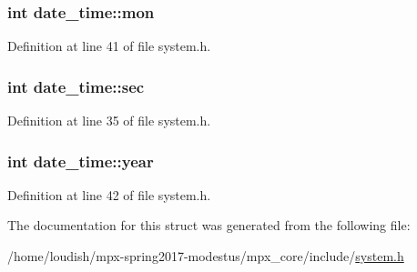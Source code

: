 \subsubsection[{\texorpdfstring{mon}{mon}}]{\setlength{\rightskip}{0pt plus 5cm}int date\+\_\+time\+::mon}\hypertarget{structdate__time_a6e8a5baa74a619330ba9925cf0baf250}{}\label{structdate__time_a6e8a5baa74a619330ba9925cf0baf250}


Definition at line 41 of file system.\+h.

\subsubsection[{\texorpdfstring{sec}{sec}}]{\setlength{\rightskip}{0pt plus 5cm}int date\+\_\+time\+::sec}\hypertarget{structdate__time_ac43a109ccc7f3c46840afa8a30dc51f1}{}\label{structdate__time_ac43a109ccc7f3c46840afa8a30dc51f1}


Definition at line 35 of file system.\+h.

\subsubsection[{\texorpdfstring{year}{year}}]{\setlength{\rightskip}{0pt plus 5cm}int date\+\_\+time\+::year}\hypertarget{structdate__time_ae96e2e4cc09780eaac04038e12bbe06b}{}\label{structdate__time_ae96e2e4cc09780eaac04038e12bbe06b}


Definition at line 42 of file system.\+h.



The documentation for this struct was generated from the following file\+:\begin{DoxyCompactItemize}
\item 
/home/loudish/mpx-\/spring2017-\/modestus/mpx\+\_\+core/include/\hyperlink{system_8h}{system.\+h}\end{DoxyCompactItemize}
